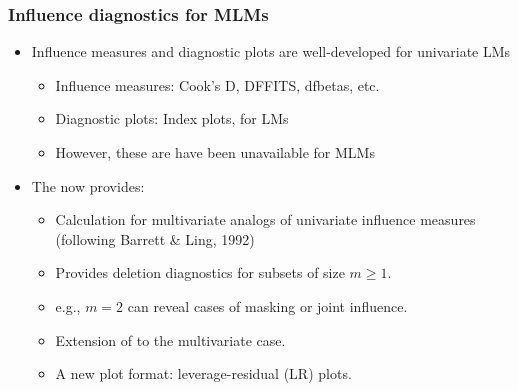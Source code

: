 \begin{frame}
  \frametitle{Influence diagnostics for MLMs}

  \begin{itemize}
  \item Influence measures and diagnostic plots are well-developed for univariate LMs
    \begin{itemize}
    \item Influence measures: Cook's D, DFFITS, dfbetas, etc.
    \item Diagnostic plots:  Index plots,  for LMs
    \item However, these are have been unavailable for MLMs  
    \end{itemize}
  \item
    The  now provides:
    \begin{itemize}
    \item Calculation for multivariate analogs of univariate influence measures
    (following Barrett \& Ling, 1992)
    \item Provides deletion diagnostics for subsets of size $m \ge 1$.
    \item e.g., $m=2$ can reveal cases of \alert{masking} or \alert{joint influence}.
    \item Extension of  to the multivariate case.
    \item A new plot format: leverage-residual (LR) plots.
    \end{itemize}
  \end{itemize}
\end{frame}

